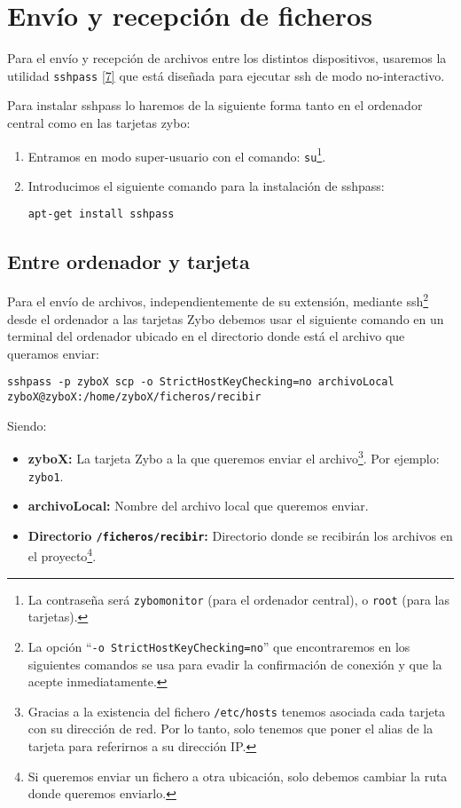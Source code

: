 \section{Envío y recepción de ficheros}
\hypertarget{EnvioRecepcionFicheros}{}
Para el envío y recepción de archivos entre los distintos dispositivos, usaremos la utilidad \texttt{sshpass} \hyperlink{7}{[7]} que está diseñada para ejecutar ssh de modo no-interactivo.

Para instalar sshpass lo haremos de la siguiente forma tanto en el ordenador central como en las tarjetas zybo:
\begin{enumerate}
	\item Entramos en modo super-usuario con el comando: \texttt{su}\footnote{La contraseña será \texttt{zybomonitor} (para el ordenador central), o \texttt{root} (para las tarjetas).}.
	\item Introducimos el siguiente comando para la instalación de sshpass:
	\begin{center}
		\texttt{apt-get install sshpass}
	\end{center}
\end{enumerate}
	
\subsection{Entre ordenador y tarjeta}
Para el envío de archivos, independientemente de su extensión, mediante ssh\footnote{La opción ``\texttt{-o StrictHostKeyChecking=no}'' que encontraremos en los siguientes comandos se usa para evadir la confirmación de conexión y que la acepte inmediatamente.} desde el ordenador a las tarjetas Zybo debemos usar el siguiente comando en un terminal del ordenador ubicado en el directorio donde está el archivo que queramos enviar:
\begin{center}
	\texttt{sshpass -p zyboX scp -o StrictHostKeyChecking=no archivoLocal zyboX@zyboX:/home/zyboX/ficheros/recibir}
\end{center}
Siendo:
\begin{itemize}
	\item \textbf{zyboX:} La tarjeta Zybo a la que queremos enviar el archivo\footnote{Gracias a la existencia del fichero \texttt{/etc/hosts} tenemos asociada cada tarjeta con su dirección de red. Por lo tanto, solo tenemos que poner el alias de la tarjeta para referirnos a su dirección IP.}. Por ejemplo: \texttt{zybo1}.
	\item \textbf{archivoLocal:} Nombre del archivo local que queremos enviar.
	\item \textbf{Directorio \texttt{/ficheros/recibir}:} Directorio donde se recibirán los archivos en el proyecto\footnote{Si queremos enviar un fichero a otra ubicación, solo debemos cambiar la ruta donde queremos enviarlo.}.
\end{itemize}

